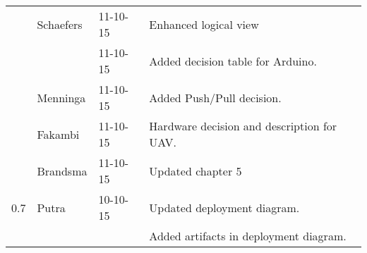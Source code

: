 \begin{longtable}{L{} L{} L{} L{}}
	                 & Schaefers             & 11-10-15      & Enhanced logical view                                                                                                                                                                                                      \\
	                 &                       & 11-10-15      & Added decision table for Arduino.                                                                                                                                                                                          \\
	                 & Menninga              & 11-10-15      & Added Push/Pull decision.                                                                                                                                                                                                  \\
	                 & Fakambi               & 11-10-15      & Hardware decision and description for UAV.                                                                                                                                                                                 \\
	                 & Brandsma              & 11-10-15      & Updated chapter 5                                                                                                                                                                                                          \\
	\midrule
			
	0.7              & Putra                 & 10-10-15      & Updated deployment diagram.                                                                                                                                                                                                \\
	                 &                       &               & Added artifacts in deployment diagram.                                                                                                                                                                                     \\
	\bottomrule
\end{longtable}